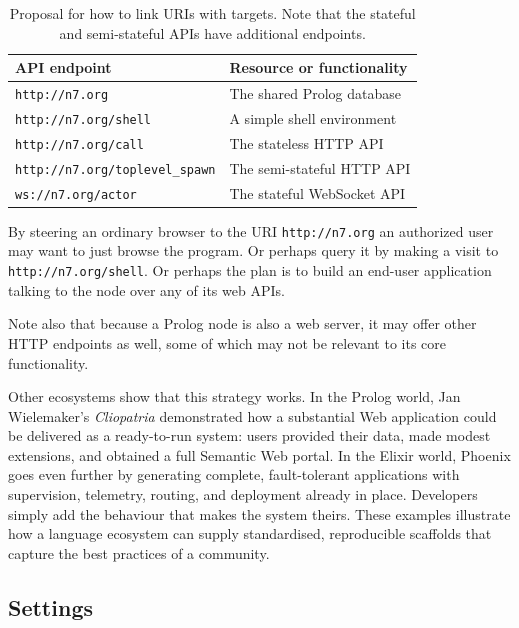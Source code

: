 \renewcommand{\arraystretch}{1.2}
\begin{table}[h]
\begin{center}
    \begin{tabular}{ | p{5cm} | p{6cm} |}
    \hline
    \textbf{API endpoint} &  \textbf{Resource or functionality} \\ \hline
    \texttt{http://n7.org} & The shared Prolog database \\ \hline
    \texttt{http://n7.org/shell} & A simple shell environment\\ \hline    
    \texttt{http://n7.org/call} & The stateless HTTP API \\ \hline
    \texttt{http://n7.org/toplevel\_spawn} & The semi-stateful HTTP API \\ \hline
    \texttt{ws://n7.org/actor} & The stateful WebSocket API \\ \hline 
    \end{tabular}
\end{center}
\caption{Proposal for how to link URIs with targets. Note that the stateful and semi-stateful APIs have additional endpoints.}
\label{table:node-urls}
\end{table}

\noindent By steering an ordinary browser to the URI \texttt{http://n7.org} an authorized user may want to just browse the program. Or perhaps query it by making a visit to \texttt{http://n7.org/shell}. Or perhaps the plan is to build an end-user application talking to the node over any of its web APIs.

Note also that because a Prolog node is also a web server, it may offer other HTTP endpoints as well, some of which may not be relevant to its core functionality.


Other ecosystems show that this strategy works. In the Prolog world, Jan Wielemaker's \textit{Cliopatria} demonstrated how a substantial Web application could be delivered as a ready-to-run system: users provided their data, made modest extensions, and obtained a full Semantic Web portal. In the Elixir world, Phoenix goes even further by generating complete, fault-tolerant applications with supervision, telemetry, routing, and deployment already in place. Developers simply add the behaviour that makes the system theirs. These examples illustrate how a language ecosystem can supply standardised, reproducible scaffolds that capture the best practices of a community.


\subsection{Settings}\label{sec:node-settings}

